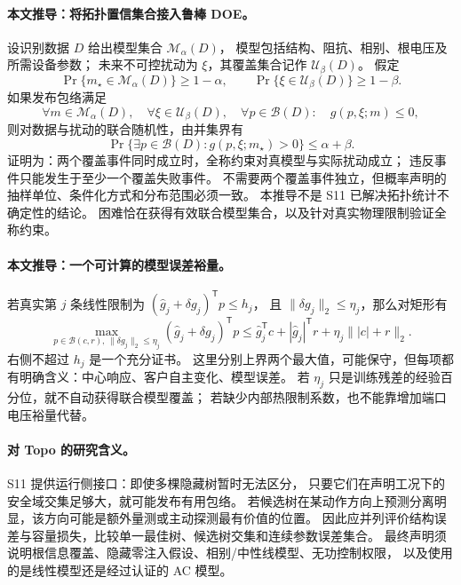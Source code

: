 \paragraph{本文推导：将拓扑置信集合接入鲁棒 DOE。}
设识别数据 $D$ 给出模型集合 $\mathcal M_\alpha(D)$，
模型包括结构、阻抗、相别、根电压及所需设备参数；
未来不可控扰动为 $\xi$，其覆盖集合记作 $\mathcal U_\beta(D)$。
假定
\begin{equation}
 \Pr\{m_\star\in\mathcal M_\alpha(D)\}\geq1-\alpha,
 \qquad
 \Pr\{\xi\in\mathcal U_\beta(D)\}\geq1-\beta.
 \label{eq:eng-s11-coverage}
\end{equation}
如果发布包络满足
\begin{equation}
 \forall m\in\mathcal M_\alpha(D),\quad
 \forall\xi\in\mathcal U_\beta(D),\quad
 \forall p\in\mathcal B(D):\quad g(p,\xi;m)\leq0,
 \label{eq:eng-s11-robust-models}
\end{equation}
则对数据与扰动的联合随机性，由并集界有
\begin{equation}
 \Pr\{\exists p\in\mathcal B(D):g(p,\xi;m_\star)>0\}
 \leq\alpha+\beta.
 \label{eq:eng-s11-union}
\end{equation}
证明为：两个覆盖事件同时成立时，全称约束对真模型与实际扰动成立；
违反事件只能发生于至少一个覆盖失败事件。
不需要两个覆盖事件独立，但概率声明的抽样单位、条件化方式和分布范围必须一致。
本推导不是 S11 已解决拓扑统计不确定性的结论。
困难恰在获得有效联合模型集合，以及针对真实物理限制验证全称约束。

\paragraph{本文推导：一个可计算的模型误差裕量。}
若真实第 $j$ 条线性限制为 $(\widehat g_j+\delta g_j)^{\mathsf T}p\leq h_j$，
且 $\|\delta g_j\|_2\leq\eta_j$，那么对矩形有
\begin{equation}
 \max_{p\in\mathcal B(c,r),\,\|\delta g_j\|_2\leq\eta_j}
 (\widehat g_j+\delta g_j)^{\mathsf T}p
 \leq\widehat g_j^{\mathsf T}c+|\widehat g_j|^{\mathsf T}r
       +\eta_j\big\||c|+r\big\|_2.
 \label{eq:eng-s11-margin}
\end{equation}
右侧不超过 $h_j$ 是一个充分证书。
这里分别上界两个最大值，可能保守，但每项都有明确含义：中心响应、客户自主变化、模型误差。
若 $\eta_j$ 只是训练残差的经验百分位，就不自动获得联合模型覆盖；
若缺少内部热限制系数，也不能靠增加端口电压裕量代替。

\paragraph{对 Topo 的研究含义。}
S11 提供运行侧接口：即使多棵隐藏树暂时无法区分，
只要它们在声明工况下的安全域交集足够大，就可能发布有用包络。
若候选树在某动作方向上预测分离明显，该方向可能是额外量测或主动探测最有价值的位置。
因此应并列评价结构误差与容量损失，比较单一最佳树、候选树交集和连续参数误差集合。
最终声明须说明根信息覆盖、隐藏零注入假设、相别/中性线模型、无功控制权限，
以及使用的是线性模型还是经过认证的 AC 模型。
